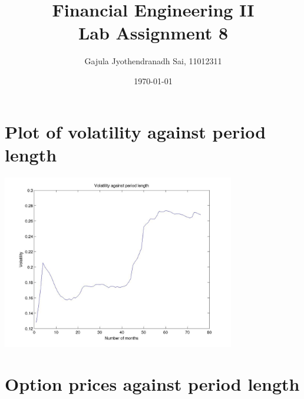 \documentclass[12pt]{article}
\begin{document}
\title{Financial Engineering II\\Lab Assignment 8}
\author{Gajula Jyothendranadh Sai, 11012311}
\date{\today}
\maketitle
\tableofcontents
\newpage

\section{Plot of volatility against period length}
  \begin{center}
    \includegraphics[width=4in]{volatility.jpg}
  \end{center}

\section{Option prices against period length}
\end{document}
